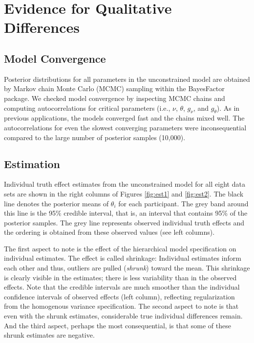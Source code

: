 \documentclass[
  english,
  ,man,floatsintext]{apa6}
\begin{document}
\hypertarget{evidence-for-qualitative-differences}{%
\section{Evidence for Qualitative Differences}\label{evidence-for-qualitative-differences}}

\hypertarget{model-convergence}{%
\subsection{Model Convergence}\label{model-convergence}}

Posterior distributions for all parameters in the unconstrained model are obtained by Markov chain Monte Carlo (MCMC) sampling within the BayesFactor package. We checked model convergence by inspecting MCMC chains and computing autocorrelations for critical parameters (i.e., \(\nu\), \(\theta\), \(g_\nu\), and \(g_\theta\)). As in previous applications, the models converged fast and the chains mixed well. The autocorrelations for even the slowest converging parameters were inconsequential compared to the large number of posterior samples (10,000).

\hypertarget{estimation}{%
\subsection{Estimation}\label{estimation}}

Individual truth effect estimates from the unconstrained model for all eight data sets are shown in the right columns of Figures \ref{fig:est1} and \ref{fig:est2}. The black line denotes the posterior means of \(\theta_i\) for each participant. The grey band around this line is the 95\% credible interval, that is, an interval that contains 95\% of the posterior samples. The grey line represents observed individual truth effects and the ordering is obtained from these observed values (see left columns).

The first aspect to note is the effect of the hierarchical model specification on individual estimates. The effect is called shrinkage: Individual estimates inform each other and thus, outliers are pulled (\textit{shrunk}) toward the mean. This shrinkage is clearly visible in the estimates; there is less variability than in the observed effects. Note that the credible intervals are much smoother than the individual confidence intervals of observed effects (left column), reflecting regularization from the homogenous variance specification. The second aspect to note is that even with the shrunk estimates, considerable true individual differences remain. And the third aspect, perhaps the most consequential, is that some of these shrunk estimates are negative.
\end{document}
